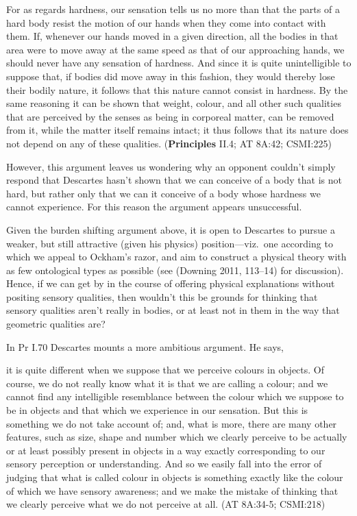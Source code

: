 \documentclass[12pt]{article}
\makeatletter
\newcommand{\citeprocitem}[2]{\hyper@linkstart{cite}{citeproc_bib_item_#1}#2\hyper@linkend}
\makeatother
\begin{document}
\begin{quote-b}
For as regards hardness, our sensation tells us no more than that the
parts of a hard body resist the motion of our hands when they come
into contact with them. If, whenever our hands moved in a given
direction, all the bodies in that area were to move away at the same
speed as that of our approaching hands, we should never have any
sensation of hardness. And since it is quite unintelligible to suppose
that, if bodies did move away in this fashion, they would thereby lose
their bodily nature, it follows that this nature cannot consist in
hardness. By the same reasoning it can be shown that weight, colour,
and all other such qualities that are perceived by the senses as being
in corporeal matter, can be removed from it, while the matter itself
remains intact; it thus follows that its nature does not depend on any
of these qualities. (\textbf{Principles} II.4; AT 8A:42; CSMI:225)
\end{quote-b}

However, this argument leaves us wondering why an opponent couldn't
simply respond that Descartes hasn't shown that we can conceive of a
body that is not hard, but rather only that we can it conceive of a body
whose hardness we cannot experience. For this reason the argument
appears unsuccessful.

Given the burden shifting argument above, it is open to Descartes to
pursue a weaker, but still attractive (given his physics)
position---viz. one according to which we appeal to Ockham's razor, and
aim to construct a physical theory with as few ontological types as
possible (see (\citeprocitem{4}{Downing 2011, 113–14}) for discussion). Hence, if we can
get by in the course of offering physical explanations without positing
sensory qualities, then wouldn't this be grounds for thinking that
sensory qualities aren't really in bodies, or at least not in them in
the way that geometric qualities are?

In Pr I.70 Descartes mounts a more ambitious argument. He says,

\begin{quote-b}
it is quite different when we suppose that we perceive colours in
objects. Of course, we do not really know what it is that we are
calling a colour; and we cannot find any intelligible resemblance
between the colour which we suppose to be in objects and that which we
experience in our sensation. But this is something we do not take
account of; and, what is more, there are many other features, such as
size, shape and number which we clearly perceive to be actually or at
least possibly present in objects in a way exactly corresponding to
our sensory perception or understanding. And so we easily fall into
the error of judging that what is called colour in objects is
something exactly like the colour of which we have sensory awareness;
and we make the mistake of thinking that we clearly perceive what we
do not perceive at all. (AT 8A:34-5; CSMI:218)
\end{quote-b}
\end{document}
